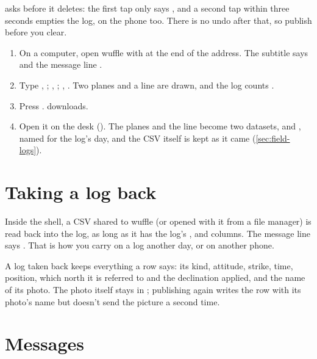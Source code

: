  asks before it deletes: the first tap only says , and a second tap within three seconds empties the log, on
the phone too. There is no undo after that, so publish before you clear.

\begin{tryit}
\begin{enumerate}
\item On a computer, open wuffle with  at the end of the address. The subtitle says
 and the message line .
\item Type , ; , ; , . Two
planes and a line are drawn, and the log counts .
\item Press .  downloads.
\item Open it on the desk (). The planes and the line become two
datasets,  and , named for the log's day, and the CSV
itself is kept as it came (\cref{sec:field-logs}).
\end{enumerate}
\end{tryit}

\section{Taking a log back}

Inside the shell, a CSV shared to wuffle (or opened with it from a file manager) is read back into the
log, as long as it has the log's ,  and 
columns. The message line says . That is how you carry on a
log another day, or on another phone.

A log taken back keeps everything a row says: its kind, attitude, strike, time, position, which north
it is referred to and the declination applied, and the name of its photo. The photo itself stays in
; publishing again writes the row with its photo's name but doesn't send the picture a
second time.

\section{Messages}\label{sec:field-msgs}

